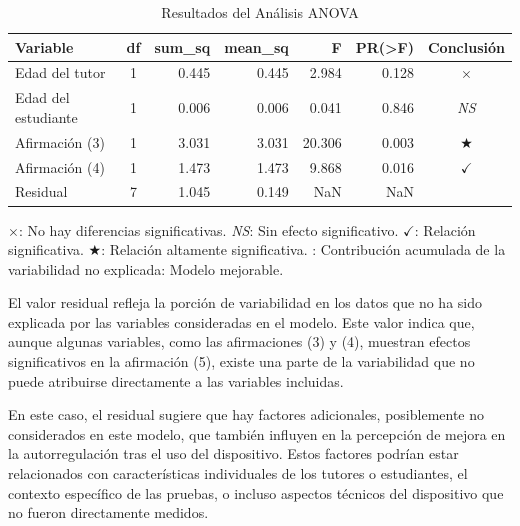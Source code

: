 \documentclass[a4paper,fleqn]{cas-sc}
\begin{document}
					\begin{table}[h!]
						\centering
						\caption{Resultados del Análisis ANOVA}
						\begin{tabularx}{0.75\textwidth}{Xcrrrrc}
							\toprule
							\textbf{Variable} & \textbf{df} &  \textbf{sum\_sq} & \textbf{mean\_sq} & \textbf{F} & \textbf{PR(>F)} & \textbf{Conclusión}\\
							\midrule
							Edad del tutor & 1 & 0.445 & 0.445 & 2.984 & 0.128 & \(\times\)  \\ %
							Edad del estudiante & 1 & 0.006 & 0.006 & 0.041 & 0.846 & \textit{NS}\\ %
							Afirmación (3) & 1 & 3.031 & 3.031 & 20.306 & 0.003 & \(\bigstar\) \\ %
							Afirmación (4) & 1 & 1.473 & 1.473 & 9.868 & 0.016 & \(\checkmark\) \\ %
							Residual & 7 & 1.045 & 0.149 & NaN & NaN & \faExclamationTriangle \\ %
							\bottomrule
						\end{tabularx}
						\label{table:ANOVA-Results}
						\vspace{0.3em} %
						\parbox{0.75\textwidth}{\footnotesize 
							\(\times\): No hay diferencias significativas. \textit{NS}: Sin efecto significativo. \(\checkmark\): Relación significativa. \(\bigstar\): Relación altamente significativa. \faExclamationTriangle: Contribución acumulada de la variabilidad no explicada: Modelo mejorable.
						}
					\end{table}
					
					El valor residual refleja la porción de variabilidad en los datos que no ha sido explicada por las variables consideradas en el modelo. Este valor indica que, aunque algunas variables, como las afirmaciones (3) y (4), muestran efectos significativos en la afirmación (5), existe una parte de la variabilidad que no puede atribuirse directamente a las variables incluidas.
					
					En este caso, el residual sugiere que hay factores adicionales, posiblemente no considerados en este modelo, que también influyen en la percepción de mejora en la autorregulación tras el uso del dispositivo. Estos factores podrían estar relacionados con características individuales de los tutores o estudiantes, el contexto específico de las pruebas, o incluso aspectos técnicos del dispositivo que no fueron directamente medidos.
					
\end{document}
